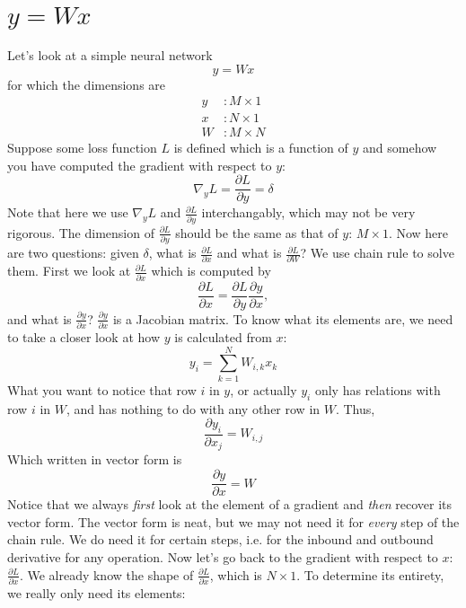 \documentclass{article}
\begin{document}
\section{$y = Wx$}
Let's look at a simple neural network
\begin{equation}
    y = Wx
\end{equation}
for which the dimensions are
\begin{align}
    y &: M \times 1 \\
    x &: N \times 1 \\
    W &: M \times N
\end{align}
Suppose some loss function $L$ is defined which is a function of $y$ and somehow you have computed the gradient with respect to $y$:
\begin{equation}
    \nabla_yL = \frac{\partial L}{\partial y} = \delta
\end{equation}
Note that here we use $\nabla_yL$ and $\frac{\partial L}{\partial y}$ interchangably, which may not be very rigorous. The dimension of $\frac{\partial L}{\partial y}$ should be the same as that of $y$: $M \times 1$. Now here are two questions: given $\delta$, what is $\frac{\partial L}{\partial x}$ and what is $\frac{\partial L}{\partial W}$? We use chain rule to solve them. First we look at $\frac{\partial L}{\partial x}$ which is computed by
\begin{equation}
    \frac{\partial L}{\partial x} = \frac{\partial L}{\partial y}\frac{\partial y}{\partial x},
\end{equation}
and what is $\frac{\partial y}{\partial x}$? $\frac{\partial y}{\partial x}$ is a Jacobian matrix. To know what its elements are, we need to take a closer look at how $y$ is calculated from $x$:
\begin{equation} \label{eq-xy}
    y_i = \sum_{k=1}^NW_{i, k}x_k
\end{equation}
What you want to notice that row $i$ in $y$, or actually $y_i$ only has relations with row $i$ in $W$, and has nothing to do with any other row in $W$. Thus, 
\begin{equation}
    \frac{\partial y_i}{\partial x_j} = W_{i, j}
\end{equation}
Which written in vector form is
\begin{equation}
    \frac{\partial y}{\partial x} = W
\end{equation}
Notice that we always \emph{first} look at the element of a gradient and \emph{then} recover its vector form. The vector form is neat, but we may not need it for \emph{every} step of the chain rule. We do need it for certain steps, i.e. for the inbound and outbound derivative for any operation. Now let's go back to the gradient with respect to $x$: $\frac{\partial L}{\partial x}$. We already know the shape of $\frac{\partial L}{\partial x}$, which is $N \times 1$. To determine its entirety, we really only need its elements:
\end{document}
